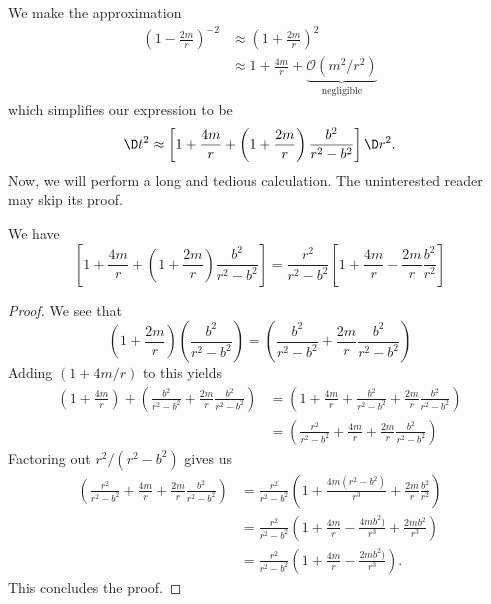 We make the approximation
\begin{equation}
\begin{split}
\left(1-\frac{2m}{r}\right)^{-2}&\approx
\left(1+\frac{2m}{r}\right)^{2}\\
&\approx 1+\frac{4m}{r}+\underbrace{\mathcal{O}(m^{2}/r^{2})}_{\text{negligible}}
\end{split}
\end{equation}
which simplifies our expression to be
\begin{equation}
\D t^{2}
\approx
\left[1+\frac{4m}{r}+\left(1+\frac{2m}{r}\right)\frac{b^{2}}{r^{2}-b^{2}}\right]\D
r^{2}.
\end{equation}
Now, we will perform a long and tedious calculation. The
uninterested reader may skip its proof.

\begin{prop}\label{prop:lec04:simplifyingCalc:shapiroTimeDelay}
We have
\begin{equation}
\left[1+\frac{4m}{r}+\left(1+\frac{2m}{r}\right)\frac{b^{2}}{r^{2}-b^{2}}\right]
=
\frac{r^{2}}{r^{2}-b^{2}}\left[1
+\frac{4m}{r}-\frac{2m}{r}\frac{b^{2}}{r^{2}}\right]
\end{equation}
\end{prop}
\begin{proof}
We see that
\begin{equation}
\left(1+\frac{2m}{r}\right)\left(\frac{b^{2}}{r^{2}-b^{2}}\right)
=\left(\frac{b^{2}}{r^{2}-b^{2}}+\frac{2m}{r}\frac{b^{2}}{r^{2}-b^{2}}\right)
\end{equation}
Adding $(1+4m/r)$ to this yields
\begin{equation}
\begin{split}
\left(1+\frac{4m}{r}\right)+\left(\frac{b^{2}}{r^{2}-b^{2}}+\frac{2m}{r}\frac{b^{2}}{r^{2}-b^{2}}\right)
&=\left(1+\frac{4m}{r}+\frac{b^{2}}{r^{2}-b^{2}}+\frac{2m}{r}\frac{b^{2}}{r^{2}-b^{2}}\right)\\
&=\left(\frac{r^{2}}{r^{2}-b^{2}}+\frac{4m}{r}+\frac{2m}{r}\frac{b^{2}}{r^{2}-b^{2}}\right)
\end{split}
\end{equation}
Factoring out $r^{2}/(r^{2}-b^{2})$ gives us
\begin{subequations}
\begin{align}
\left(\frac{r^{2}}{r^{2}-b^{2}}+\frac{4m}{r}+\frac{2m}{r}\frac{b^{2}}{r^{2}-b^{2}}\right)
&=
\frac{r^{2}}{r^{2}-b^{2}}\left(1+\frac{4m(r^{2}-b^{2})}{r^{3}}+\frac{2m}{r}\frac{b^{2}}{r^{2}}\right)\\
&=\frac{r^{2}}{r^{2}-b^{2}}\left(1+\frac{4m}{r}-\frac{4mb^{2})}{r^{3}}+\frac{2mb^{2}}{r^{3}}\right)\\
&=\frac{r^{2}}{r^{2}-b^{2}}\left(1+\frac{4m}{r}-\frac{2mb^{2})}{r^{3}}\right).
\end{align}
\end{subequations}
This concludes the proof.
\end{proof}

